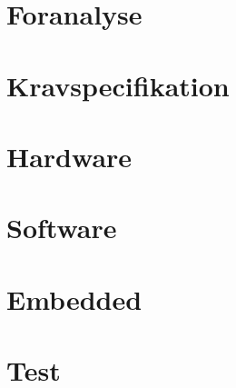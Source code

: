 



\renewcommand\chaptername{Kapitel}
\renewcommand\contentsname{Indholdsfortegnelse}
\renewcommand\figurename{Figur}
\renewcommand\tablename{Tabel} 


\cleardoublepage

\frontmatter




\cleardoublepage

\tableofcontents*
\newpage
\printnomenclature
\renewcommand*\listfigurename{Figurliste}
\renewcommand*\listtablename{Tabelliste}

\mainmatter
\chapter{Foranalyse}



\chapter{Kravspecifikation}


\chapter{Hardware}


\chapter{Software}


\chapter{Embedded}


\chapter{Test}


